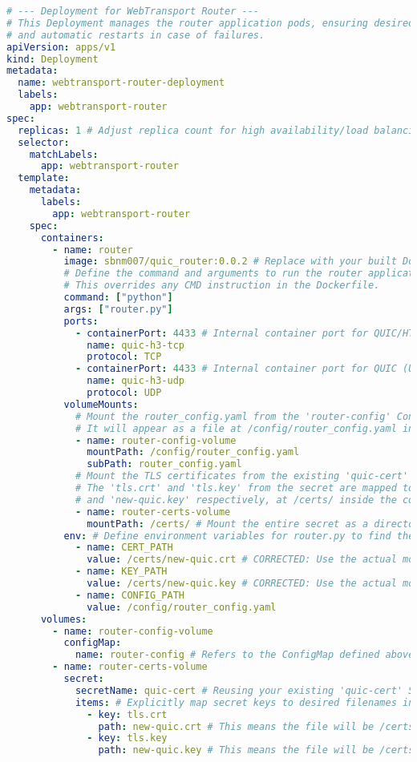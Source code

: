\begin{lstlisting}[breaklines=true, caption={Router Kubernetes Deployment}, language=yaml]
# --- Deployment for WebTransport Router ---
# This Deployment manages the router application pods, ensuring desired replica count
# and automatic restarts in case of failures.
apiVersion: apps/v1
kind: Deployment
metadata:
  name: webtransport-router-deployment
  labels:
    app: webtransport-router
spec:
  replicas: 1 # Adjust replica count for high availability/load balancing
  selector:
    matchLabels:
      app: webtransport-router
  template:
    metadata:
      labels:
        app: webtransport-router
    spec:
      containers:
        - name: router
          image: sbnm007/quic_router:0.0.2 # Replace with your built Docker image
          # Define the command and arguments to run the router application.
          # This overrides any CMD instruction in the Dockerfile.
          command: ["python"]
          args: ["router.py"]
          ports:
            - containerPort: 4433 # Internal container port for QUIC/HTTP/3 (TCP fallback)
              name: quic-h3-tcp
              protocol: TCP
            - containerPort: 4433 # Internal container port for QUIC (UDP)
              name: quic-h3-udp
              protocol: UDP
          volumeMounts:
            # Mount the router_config.yaml from the 'router-config' ConfigMap.
            # It will appear as a file at /config/router_config.yaml inside the container.
            - name: router-config-volume
              mountPath: /config/router_config.yaml
              subPath: router_config.yaml
            # Mount the TLS certificates from the existing 'quic-cert' Secret.
            # The 'tls.crt' and 'tls.key' from the secret are mapped to 'new-quic.crt'
            # and 'new-quic.key' respectively, at /certs/ inside the container.
            - name: router-certs-volume
              mountPath: /certs/ # Mount the entire secret as a directory
          env: # Define environment variables for router.py to find the mounted files
            - name: CERT_PATH
              value: /certs/new-quic.crt # CORRECTED: Use the actual mounted filename
            - name: KEY_PATH
              value: /certs/new-quic.key # CORRECTED: Use the actual mounted filename
            - name: CONFIG_PATH
              value: /config/router_config.yaml
      volumes:
        - name: router-config-volume
          configMap:
            name: router-config # Refers to the ConfigMap defined above
        - name: router-certs-volume
          secret:
            secretName: quic-cert # Reusing your existing 'quic-cert' Secret
            items: # Explicitly map secret keys to desired filenames in the volume
              - key: tls.crt
                path: new-quic.crt # This means the file will be /certs/new-quic.crt
              - key: tls.key
                path: new-quic.key # This means the file will be /certs/new-quic.key


\end{lstlisting}
